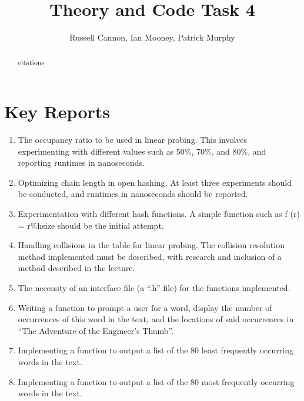 \documentclass[12pt]{article}
\begin{document}
\title{Theory and Code Task 4}
\author{Russell Cannon, Ian Mooney, Patrick Murphy}

\maketitle
\singlespacing

\begin{abstract}
\begin{center}
citations
\end{center}
\end{abstract}

\newpage

\section{Key Reports}
\begin{enumerate}
\item 
The occupancy ratio to be used in linear probing. This involves experimenting with different values such
as 50\%, 70\%, and 80\%, and reporting runtimes in nanoseconds.

\item
Optimizing chain length in open hashing. At least three experiments should be conducted, and runtimes
in nanoseconds should be reported.

\item
Experimentation with different hash functions. A simple function such as f (r) = r\%hsize should be the
initial attempt.

\item
Handling collisions in the table for linear probing. The collision resolution method implemented must be
described, with research and inclusion of a method described in the lecture.

\item
The necessity of an interface file (a “.h” file) for the functions implemented.

\item
Writing a function to prompt a user for a word, display the number of occurrences of this word in the
text, and the locations of said occurrences in “The Adventure of the Engineer’s Thumb”.

\item
Implementing a function to output a list of the 80 least frequently occurring words in the text.

\item
Implementing a function to output a list of the 80 most frequently occurring words in the text.
\end{enumerate}
\end{document}
